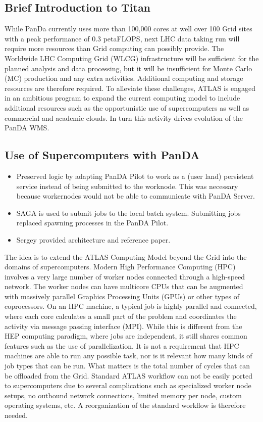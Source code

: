 \subsection{Brief Introduction to Titan}

While PanDa  currently uses  more than 100,000  cores at well over 100 Grid
sites with a  peak performance  of 0.3 petaFLOPS,  next LHC data taking run will
require more resources  than Grid computing can possibly provide. The Worldwide
LHC Computing Grid (WLCG) infrastructure will be sufficient for the planned
analysis and data processing, but it will be insufficient  for Monte Carlo (MC)
production and any extra activities. Additional computing and storage  resources
are therefore required.  To alleviate  these challenges, ATLAS is engaged  in an
ambitious  program to expand  the current computing model to include  additional
resources such as the opportunistic   use of supercomputers   as well as
commercial and academic clouds. In turn this activity drives evolution of the
PanDA WMS\@.

\subsection{Use of Supercomputers with PanDA}

\begin{itemize}
    \item Preserved logic by adapting PanDA Pilot to work as a (user land) persistent service instead of being submitted to the worknode. This was necessary because workernodes would not be able to communicate with PanDA Server.
    \item SAGA is used to submit jobs to the local batch system. Submitting jobs replaced spawning processes in the PanDA Pilot.
    \item Sergey provided architecture and reference paper.
\end{itemize}

The idea is to extend the ATLAS Computing Model beyond the Grid into the domains
of supercomputers. Modern High Performance Computing  (HPC) involves  a very
large number of worker nodes  connected  through a  high-speed   network. The
worker nodes can have  multicore CPUs that can be augmented with massively
parallel Graphics Processing Units (GPUs) or other types of coprocessors. On an
HPC machine, a  typical job is highly parallel and connected,  where each core
calculates  a small part of the problem and coordinates the activity via message
passing interface (MPI). While this is different from the HEP computing
paradigm, where jobs are independent, it still shares common  features  such as
the use of parallelization. It is not a requirement  that HPC machines are able
to run any possible task, nor is it relevant how many kinds of job types that
can be run. What matters is the total number of cycles that can be offloaded
from the Grid. Standard  ATLAS  workflow  can not be easily ported to
supercomputers   due  to   several   complications such  as specialized worker
node  setups, no  outbound network connections,  limited memory per node, custom
operating systems,  etc. A reorganization  of the standard  workflow is
therefore needed.

